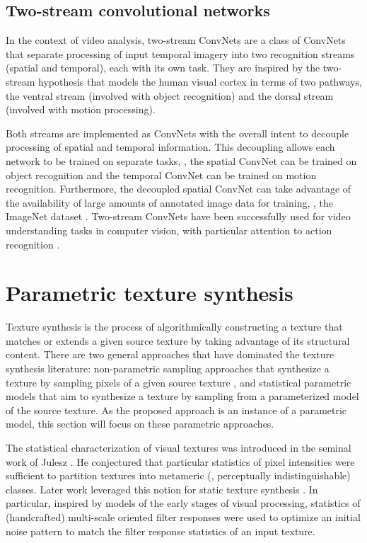 \subsection{Two-stream convolutional networks}

In the context of video analysis, two-stream ConvNets \cite{simonyan2014,feichtenhofer2016two} are a class of ConvNets that separate processing of input temporal imagery into two recognition streams (spatial and temporal), each with its own task. They are inspired by the two-stream hypothesis \cite{goodale1992} that models the human visual cortex in terms of two pathways, the ventral stream (involved with object recognition) and the dorsal stream (involved with motion processing).

Both streams are implemented as ConvNets with the overall intent to decouple processing of spatial and temporal information. This decoupling allows each network to be trained on separate tasks, \eg, the spatial ConvNet can be trained on object recognition and the temporal ConvNet can be trained on motion recognition. Furthermore, the decoupled spatial ConvNet can take advantage of the availability of large amounts of annotated image data for training, \eg, the ImageNet dataset \cite{russakovsky2015}. Two-stream ConvNets have been successfully used for video understanding tasks in computer vision, with particular attention to action recognition \cite{simonyan2014,feichtenhofer2016two}.

\section{Parametric texture synthesis}

Texture synthesis is the process of algorithmically constructing a texture that
matches or extends a given source texture by taking advantage of its structural 
content. There are two general approaches that have dominated the texture
synthesis literature: non-parametric sampling approaches that
synthesize a texture by sampling pixels of a given source texture
\cite{efros1999,kwatra2003graphcut,schodl2000,wei2000}, and 
statistical parametric models that aim to synthesize a texture by sampling
from a parameterized model of the source texture.
As the proposed approach is an instance of a parametric model, this section 
will focus on these parametric approaches.

The statistical characterization of visual textures was introduced
in the seminal work of Julesz \cite{julesz1962}.
He conjectured that particular statistics of pixel intensities
were sufficient to partition textures into metameric (\ie,
perceptually indistinguishable) classes. 
Later work leveraged this notion for static texture synthesis
\cite{heeger1995pyramid,portilla2000parametric}.
In particular, inspired by models of the early stages of visual 
processing, statistics of (handcrafted) multi-scale oriented filter 
responses were used to optimize an initial noise pattern 
to match the filter response statistics of an input texture.

